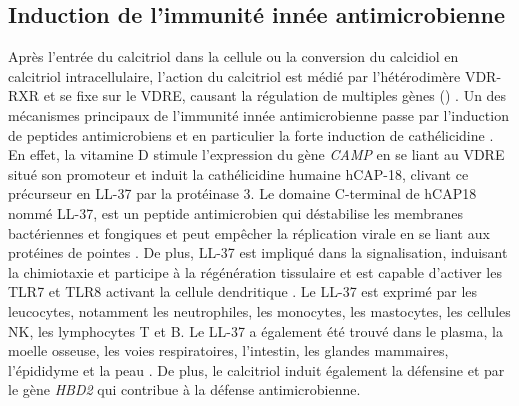 \documentclass[
  a4paper,
  DIV=11,
  numbers=noendperiod,
  listof=totoc]{scrreprt}
\begin{document}
\subsection{Induction de l'immunité innée
antimicrobienne}\label{induction-de-limmunituxe9-innuxe9e-antimicrobienne}

Après l'entrée du calcitriol dans la cellule ou la conversion du
calcidiol en calcitriol intracellulaire, l'action du calcitriol est
médié par l'hétérodimère \ac{VDR}-\ac{RXR} et se fixe sur le \ac{VDRE},
causant la régulation de multiples gènes
() \autocite{Caprio.2017,Yasmin.2005}. Un
des mécanismes principaux de l'immunité innée antimicrobienne passe par
l'induction de peptides antimicrobiens et en particulier la forte
induction de cathélicidine \autocite{Wang.2004}. En effet, la vitamine D
stimule l'expression du gène \emph{CAMP} en se liant au \ac{VDRE} situé
son promoteur et induit la cathélicidine humaine hCAP-18, clivant ce
précurseur en LL-37 par la protéinase 3. Le domaine C-terminal de hCAP18
nommé LL-37, est un peptide antimicrobien qui déstabilise les membranes
bactériennes et fongiques et peut empêcher la réplication virale en se
liant aux protéines de pointes \autocite{Bishop.2021,Charoenngam.2020}.
De plus, LL-37 est impliqué dans la signalisation, induisant la
chimiotaxie et participe à la régénération tissulaire et est capable
d'activer les TLR7 et TLR8 activant la cellule dendritique
\autocite{Silva.2012}. Le LL-37 est exprimé par les leucocytes,
notamment les neutrophiles, les monocytes, les mastocytes, les cellules
NK, les lymphocytes T et B. Le LL-37 a également été trouvé dans le
plasma, la moelle osseuse, les voies respiratoires, l'intestin, les
glandes mammaires, l'épididyme et la peau \autocite{Silva.2012}. De
plus, le calcitriol induit également la défensine  et par le
gène \emph{HBD2} qui contribue à la défense antimicrobienne.
\end{document}
